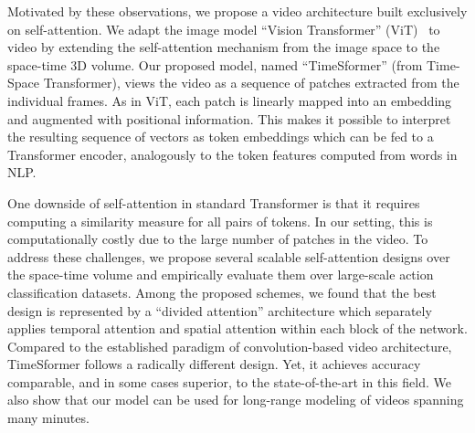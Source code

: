 \documentclass{article}
\begin{document}
Motivated by these observations, we propose a video architecture built exclusively on self-attention. We adapt the image model ``Vision Transformer'' (ViT)~\cite{Dosovitskiy:ICLR2021} to video by extending the self-attention mechanism from the image space to the space-time 3D volume. Our proposed model, named ``TimeSformer'' (from Time-Space Transformer), views the video as a sequence of patches extracted from the individual frames. As in ViT, each patch is linearly mapped into an embedding and augmented with positional information. This makes it possible to interpret the resulting sequence of vectors as token embeddings which can be fed to a Transformer encoder, analogously to the token features computed from words in NLP. 

One downside of self-attention in standard Transformer is that it requires computing a similarity measure for all pairs of tokens. In our setting, this is computationally costly due to the large number of patches in the video. To address these challenges, we propose several scalable self-attention designs over the space-time volume and empirically evaluate them over large-scale action classification datasets. Among the proposed schemes, we found that the best design is represented by a ``divided attention'' architecture which separately applies temporal attention and spatial attention within each block of the network. Compared to the established paradigm of convolution-based video architecture, TimeSformer follows a radically different design. Yet, it achieves accuracy comparable, and in some cases superior, to the state-of-the-art in this field. We also show that our model can be used for long-range modeling of videos spanning many minutes.




\end{document}
